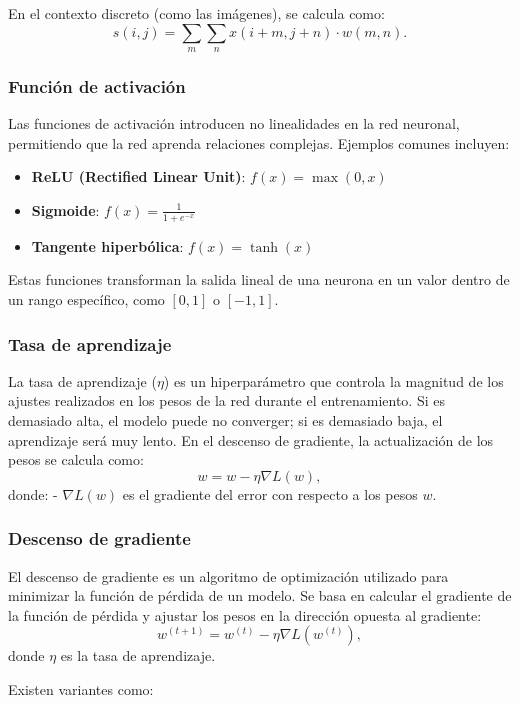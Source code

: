 \documentclass[../main.tex]{subfiles}
\begin{document}
En el contexto discreto (como las imágenes), se calcula como:
\[
s(i, j) = \sum_{m}\sum_{n} x(i+m, j+n) \cdot w(m, n).
\]

\subsubsection{Función de activación}

Las funciones de activación introducen no linealidades en la red neuronal, permitiendo que la red aprenda relaciones complejas. Ejemplos comunes incluyen:

\begin{itemize}
    \item \textbf{ReLU (Rectified Linear Unit)}: \( f(x) = \max(0, x) \)
    \item \textbf{Sigmoide}: \( f(x) = \frac{1}{1 + e^{-x}} \)
    \item \textbf{Tangente hiperbólica}: \( f(x) = \tanh(x) \)
\end{itemize}

Estas funciones transforman la salida lineal de una neurona en un valor dentro de un rango específico, como \([0, 1]\) o \([-1, 1]\).

\subsubsection{Tasa de aprendizaje}

La tasa de aprendizaje (\( \eta \)) es un hiperparámetro que controla la magnitud de los ajustes realizados en los pesos de la red durante el entrenamiento. Si es demasiado alta, el modelo puede no converger; si es demasiado baja, el aprendizaje será muy lento. En el descenso de gradiente, la actualización de los pesos se calcula como:
\[
w = w - \eta \nabla L(w),
\]
donde:
- \( \nabla L(w) \) es el gradiente del error con respecto a los pesos \( w \).

\subsubsection{Descenso de gradiente}

El descenso de gradiente es un algoritmo de optimización utilizado para minimizar la función de pérdida de un modelo. Se basa en calcular el gradiente de la función de pérdida y ajustar los pesos en la dirección opuesta al gradiente:
\[
w^{(t+1)} = w^{(t)} - \eta \nabla L(w^{(t)}),
\]
donde \( \eta \) es la tasa de aprendizaje.

Existen variantes como:
\end{document}
